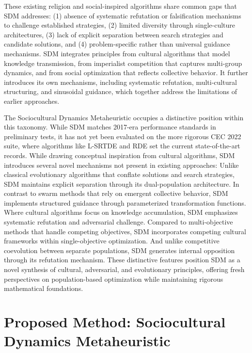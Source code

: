 \documentclass[11pt]{article}
\begin{document}
These existing religion and social-inspired algorithms share common gaps that SDM addresses: (1) absence of systematic refutation or falsification mechanisms to challenge established strategies, (2) limited diversity through single-culture architectures, (3) lack of explicit separation between search strategies and candidate solutions, and (4) problem-specific rather than universal guidance mechanisms. SDM integrates principles from cultural algorithms that model knowledge transmission, from imperialist competition that captures multi-group dynamics, and from social optimization that reflects collective behavior. It further introduces its own mechanisms, including systematic refutation, multi-cultural structuring, and sinusoidal guidance, which together address the limitations of earlier approaches.

The Sociocultural Dynamics Metaheuristic occupies a distinctive position within this taxonomy. While SDM matches 2017-era performance standards in preliminary tests, it has not yet been evaluated on the more rigorous CEC 2022 suite, where algorithms like L-SRTDE and RDE set the current state-of-the-art records. While drawing conceptual inspiration from cultural algorithms, SDM introduces several novel mechanisms not present in existing approaches:
Unlike classical evolutionary algorithms that conflate solutions and search strategies, SDM maintains explicit separation through its dual-population architecture. In contrast to swarm methods that rely on emergent collective behavior, SDM implements structured guidance through parameterized transformation functions. Where cultural algorithms focus on knowledge accumulation, SDM emphasizes systematic refutation and adversarial challenge. Compared to multi-objective methods that handle competing objectives, SDM incorporates competing cultural frameworks within single-objective optimization. And unlike competitive coevolution between separate populations, SDM generates internal opposition through its refutation mechanism.
These distinctive features position SDM as a novel synthesis of cultural, adversarial, and evolutionary principles, offering fresh perspectives on population-based optimization while maintaining rigorous mathematical foundations.



\section{Proposed Method: Sociocultural Dynamics Metaheuristic}
\label{sec:method}
\end{document}
